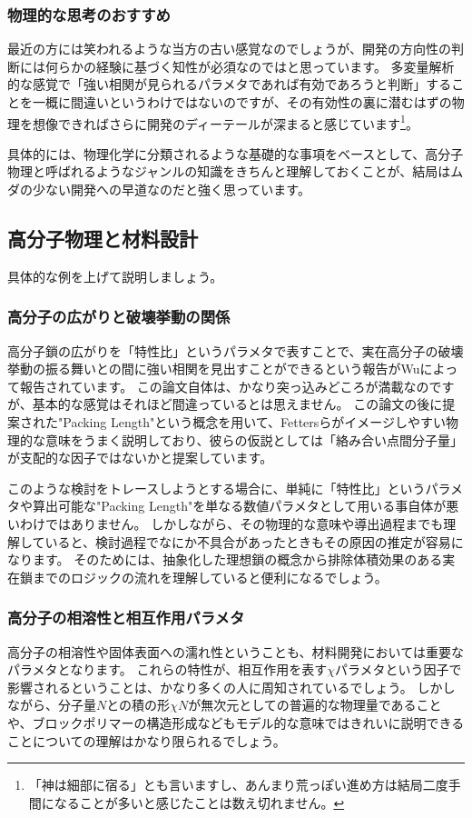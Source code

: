 \documentclass[a4paper,11pt]{jlreq}
\begin{document}
\subsubsection{物理的な思考のおすすめ}
最近の方には笑われるような当方の古い感覚なのでしょうが、開発の方向性の判断には何らかの経験に基づく知性が必須なのではと思っています。
多変量解析的な感覚で「強い相関が見られるパラメタであれば有効であろうと判断」することを一概に間違いというわけではないのですが、その有効性の裏に潜むはずの物理を想像できればさらに開発のディーテールが深まると感じています\footnote{
    「神は細部に宿る」とも言いますし、あんまり荒っぽい進め方は結局二度手間になることが多いと感じたことは数え切れません。
}。

具体的には、物理化学に分類されるような基礎的な事項をベースとして、高分子物理と呼ばれるようなジャンルの知識をきちんと理解しておくことが、結局はムダの少ない開発への早道なのだと強く思っています。

\subsection{高分子物理と材料設計}
具体的な例を上げて説明しましょう。

\subsubsection{高分子の広がりと破壊挙動の関係}
高分子鎖の広がりを「特性比」というパラメタで表すことで、実在高分子の破壊挙動の振る舞いとの間に強い相関を見出すことができるという報告がWuによって報告されています。
この論文自体は、かなり突っ込みどころが満載なのですが、基本的な感覚はそれほど間違っているとは思えません。
この論文の後に提案された"Packing Length"という概念を用いて、Fettersらがイメージしやすい物理的な意味をうまく説明しており、彼らの仮説としては「絡み合い点間分子量」が支配的な因子ではないかと提案しています。

このような検討をトレースしようとする場合に、単純に「特性比」というパラメタや算出可能な"Packing Length"を単なる数値パラメタとして用いる事自体が悪いわけではありません。
しかしながら、その物理的な意味や導出過程までも理解していると、検討過程でなにか不具合があったときもその原因の推定が容易になります。
そのためには、抽象化した理想鎖の概念から排除体積効果のある実在鎖までのロジックの流れを理解していると便利になるでしょう。

\subsubsection{高分子の相溶性と相互作用パラメタ}
高分子の相溶性や固体表面への濡れ性ということも、材料開発においては重要なパラメタとなります。
これらの特性が、相互作用を表す$\chi$パラメタという因子で影響されるということは、かなり多くの人に周知されているでしょう。
しかしながら、分子量$N$との積の形$\chi N$が無次元としての普遍的な物理量であることや、ブロックポリマーの構造形成などもモデル的な意味ではきれいに説明できることについての理解はかなり限られるでしょう。
\end{document}
